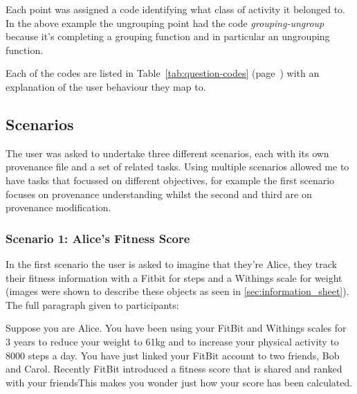Each point was assigned a code identifying what class of activity it belonged to. In the above example the ungrouping point had the code \textit{grouping-ungroup} because it's completing a grouping function and in particular an ungrouping function. 

Each of the codes are listed in Table~\ref{tab:question-codes} (page~\pageref{tab:question-codes}) with an explanation of the user behaviour they map to.

\subsection{Scenarios}
\label{sec:scenarios}

The user was asked to undertake three different scenarios, each with its own provenance file and a set of related tasks. Using multiple scenarios allowed me to have tasks that focussed on different objectives, for example the first scenario focuses on provenance understanding whilst the second and third are on provenance modification.

\subsubsection{Scenario 1: Alice's Fitness Score}
\label{ssub:scenario_1_alice_s_fitness_score}

In the first scenario the user is asked to imagine that they're Alice, they track their fitness information with a Fitbit for steps and a Withings scale for weight (images were shown to describe these objects as seen in \ref{sec:information_sheet}). The full paragraph given to participants:

\begin{framed}
Suppose you are Alice. You have been using your FitBit and Withings scales for 3 years to reduce your weight to 61kg and to increase your physical activity to 8000 steps a day. You have just linked your FitBit account to two friends, Bob and Carol. Recently FitBit introduced a fitness score that is shared and ranked with your friends\textellipsis This makes you wonder just how your score has been calculated.
\end{framed}


